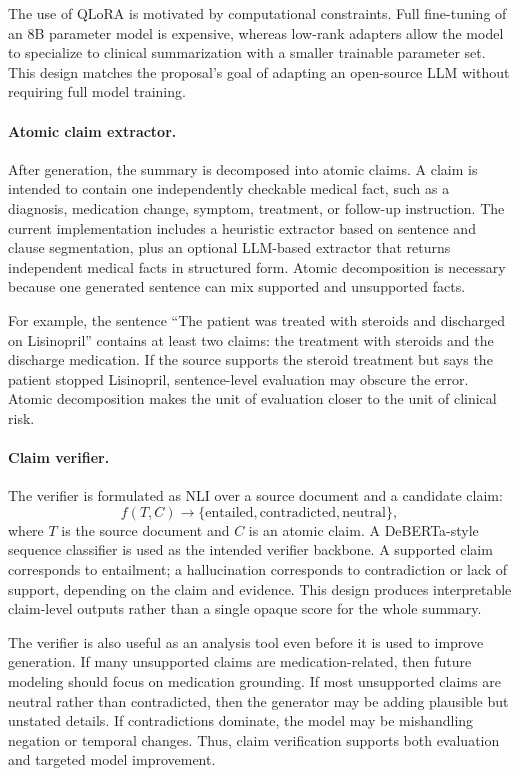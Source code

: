 \documentclass[11pt]{article}
\begin{document}
The use of QLoRA is motivated by computational constraints. Full fine-tuning of an 8B parameter model is expensive, whereas low-rank adapters allow the model to specialize to clinical summarization with a smaller trainable parameter set. This design matches the proposal's goal of adapting an open-source LLM without requiring full model training.

\paragraph{Atomic claim extractor.}
After generation, the summary is decomposed into atomic claims. A claim is intended to contain one independently checkable medical fact, such as a diagnosis, medication change, symptom, treatment, or follow-up instruction. The current implementation includes a heuristic extractor based on sentence and clause segmentation, plus an optional LLM-based extractor that returns independent medical facts in structured form. Atomic decomposition is necessary because one generated sentence can mix supported and unsupported facts.

For example, the sentence ``The patient was treated with steroids and discharged on Lisinopril'' contains at least two claims: the treatment with steroids and the discharge medication. If the source supports the steroid treatment but says the patient stopped Lisinopril, sentence-level evaluation may obscure the error. Atomic decomposition makes the unit of evaluation closer to the unit of clinical risk.

\paragraph{Claim verifier.}
The verifier is formulated as NLI over a source document and a candidate claim:
\[
f(T, C) \rightarrow \{\text{entailed}, \text{contradicted}, \text{neutral}\},
\]
where $T$ is the source document and $C$ is an atomic claim. A DeBERTa-style sequence classifier is used as the intended verifier backbone. A supported claim corresponds to entailment; a hallucination corresponds to contradiction or lack of support, depending on the claim and evidence. This design produces interpretable claim-level outputs rather than a single opaque score for the whole summary.

The verifier is also useful as an analysis tool even before it is used to improve generation. If many unsupported claims are medication-related, then future modeling should focus on medication grounding. If most unsupported claims are neutral rather than contradicted, then the generator may be adding plausible but unstated details. If contradictions dominate, the model may be mishandling negation or temporal changes. Thus, claim verification supports both evaluation and targeted model improvement.
\end{document}
